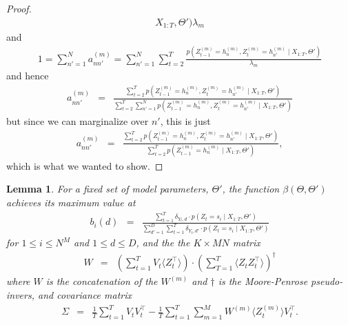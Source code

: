 \documentclass{amsart}
\newtheorem{lemma}[theorem]{Lemma}
\begin{document}
\begin{proof}
\begin{eqnarray*}
{X_{1:T},\Theta')}{\lambda_m}
\end{eqnarray*}
and 
\begin{eqnarray*}
1 = \sum_{n'=1}^Na_{nn'}^{(m)} = 
\sum_{n'=1}^N\sum_{t=2}^T\frac{p(Z_{t-1}^{(m)}=h_n^{(m)},Z_{t}^{(m)}=h_{n'}^{(m)}\mid 
X_{1:T},\Theta')}{\lambda_m}
\end{eqnarray*}
and hence 
\begin{eqnarray*}
a_{nn'}^{(m)} &=& 
\frac{\sum_{t=2}^Tp(Z_{t-1}^{(m)}=h_n^{(m)},Z_{t}^{(m)}=h_{n'}^{(m)}\mid 
X_{1:T},\Theta')}{\sum_{t=2}^T\sum_{n'=1}^Np(Z_{t-1}^{(m)}=h_{n}^{(m)},Z_{t}^{(m)}=h_{n'}^{(m)}\mid 
X_{1:T},\Theta')}
\end{eqnarray*} 
but since we can marginalize over $n'$, this is just 
\begin{eqnarray*}
a_{nn'}^{(m)} & = & 
\frac{\sum_{t=2}^Tp(Z_{t-1}^{(m)}=h_n^{(m)},Z_{t}^{(m)}=h_{n'}^{(m)}\mid 
X_{1:T},\Theta')}{\sum_{t=2}^Tp(Z_{t-1}^{(m)}=h_{n}^{(m)}\mid 
X_{1:T},\Theta')},
\end{eqnarray*}
which is what we wanted to show.
\end{proof}

\begin{lemma}\label{lemma:emission}
For a fixed set of model parameters, $\Theta'$, the function $\beta(\Theta,\Theta')$ achieves its 
maximum value at
\begin{eqnarray}\label{eqn:updatecat}
b_i(d)& = & 
\frac{\sum_{t=1}^T\delta_{Y_t,d}\cdot p(Z_t = s_i\mid 
X_{1:T},\Theta')}{\sum_{d'=1}^D\sum_{t=1}^T\delta_{Y_t,d'}\cdot p(Z_t = s_i\mid 
X_{1:T},\Theta')}
\end{eqnarray}
for $1\leq i\leq N^M$ and $1\leq d\leq D$, and the the $K\times MN$ 
matrix 
\begin{eqnarray}\label{eqn:updatemeans}
W & = & \left(\sum_{t=1}^TV_t\langle Z_t^\intercal\rangle\right)\cdot 
\left(\sum_{T=1}^T\langle 
Z_tZ_t^\intercal\rangle\right)^\dagger
\end{eqnarray}
where $W$ is the concatenation of the $W^{(m)}$ and $\dagger$ is the Moore-Penrose 
pseudo-invers, and covariance matrix 
\begin{eqnarray}\label{eqn:updatecovariance}
\Sigma & = & \frac{1}{T}\sum_{t=1}^T V_tV_t^\intercal - 
\frac{1}{T}\sum_{t=1}^T\sum_{m=1}^MW^{(m)}\langle Z_t^{(m)}\rangle 
V_t^\intercal. 
\end{eqnarray}
\end{lemma}
\end{document}
